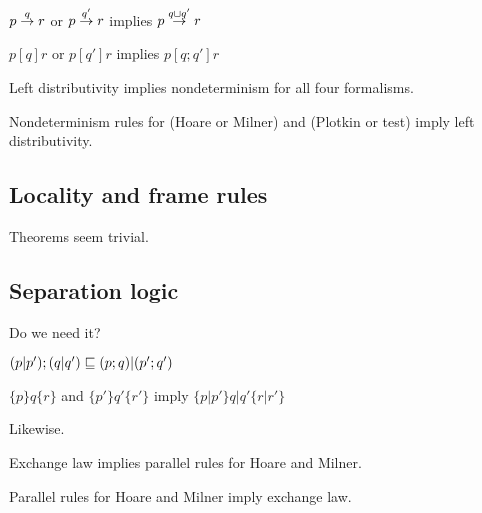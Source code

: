 \documentclass{article}
\begin{document}
\begin{rul}
$p \stackrel{q}{\rightarrow} r$ or $p \stackrel{q'}{\rightarrow} r$ implies $p \stackrel{q\sqcup q'}{\rightarrow} r$
\end{rul}

\begin{rul}
$p [q] r$ or $p [q'] r$ implies $p [q;q'] r$
\end{rul}

\begin{theorem}
Left distributivity implies nondeterminism for all four formalisms.
\end{theorem}


\begin{theorem}
Nondeterminism rules for (Hoare or Milner) and (Plotkin or test) 
imply left distributivity.
\end{theorem}


\subsection*{Locality and frame rules}
Theorems seem trivial.

\subsection*{Separation logic}

\begin{axiom}
\end{axiom}

Do we need it?

\begin{law}[Exchange]
$(p|p');(q|q') \sqsubseteq (p;q)|(p';q')$
\end{law}

\begin{rul}
$\{p\}q\{r\}$ and $\{p'\}q'\{r'\}$ imply $\{p|p'\} q|q' \{r|r'\}$
\end{rul}

\begin{rul}
Likewise.
\end{rul}

\begin{theorem}
Exchange law implies parallel rules for Hoare and Milner.
\end{theorem}

\begin{theorem}
Parallel rules for Hoare and Milner imply exchange law.
\end{theorem}
\end{document}
